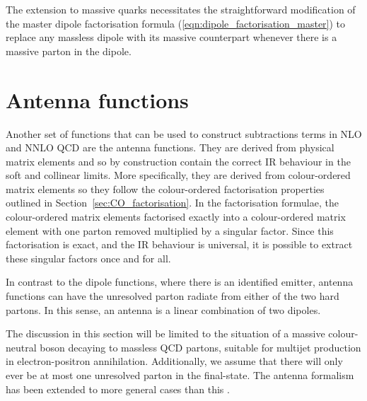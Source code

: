 \documentclass[main.tex]{subfiles}
\begin{document}
        The extension to massive quarks necessitates the straightforward
        modification of the master dipole factorisation formula
        (\ref{eqn:dipole_factorisation_master}) to replace
        any massless dipole with its massive counterpart whenever
        there is a massive parton in the dipole.

\section{Antenna functions}\label{sec:antenna_functions}
    Another set of functions that can be used to construct
    subtractions terms in NLO \cite{Kosower:1997zr,Campbell:1998nn}
    and NNLO QCD \cite{Gehrmann-DeRidder:2004ttg,Gehrmann-DeRidder:2005btv}
    are the antenna functions. They are derived from physical
    matrix elements and so by construction contain the correct
    IR behaviour in the soft and collinear limits. More specifically,
    they are derived from colour-ordered matrix elements so they
    follow the colour-ordered factorisation properties outlined
    in Section~\ref{sec:CO_factorisation}. In the factorisation
    formulae, the colour-ordered matrix elements factorised
    exactly into a colour-ordered matrix element with one parton
    removed multiplied by a singular factor. Since this factorisation
    is exact, and the IR behaviour is universal, it is possible
    to extract these singular factors once and for all.

    In contrast to the dipole functions, where there is an identified
    emitter, antenna functions can have the unresolved parton
    radiate from either of the two hard partons. In this sense,
    an antenna is a linear combination of two dipoles.

    The discussion in this section will be limited to the
    situation of a massive colour-neutral boson decaying
    to massless QCD partons, suitable for multijet production
    in electron-positron annihilation. Additionally, we
    assume that there will only ever be at most one unresolved
    parton in the final-state. The antenna formalism has been
    extended to more general cases than this \cite{Daleo:2006xa,Daleo:2009yj,Boughezal:2010mc,Gehrmann:2011wi,Gehrmann-DeRidder:2012too}.
\end{document}
